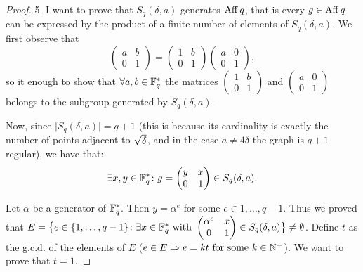 \begin{theorem}
\begin{proof}
5. I want to prove that $S_q(\delta,a)$ generates $\operatorname{Aff} q$, that is every $g \in \operatorname{Aff} q$ can be expressed by the product
of a finite number of elements of $S_q(\delta,a)$. We first observe that
\begin{equation}\label{gatto}
	\begin{pmatrix} a & b \\ 0 & 1 \end{pmatrix}=\begin{pmatrix} 1 & b \\ 0 & 1 \end{pmatrix} \begin{pmatrix} a & 0 \\ 0 & 1 \end{pmatrix},
\end{equation}
so it enough to show that $\forall a,b \in {\mathbb F}_q^{*}$ the matrices 
$\begin{pmatrix} 1 & b \\ 0 & 1 \end{pmatrix}$ and $\begin{pmatrix} a & 0 \\ 0 & 1 \end{pmatrix}$
belongs to the subgroup generated by $S_q(\delta,a)$.

Now, since $\vert S_q(\delta,a)\vert=q+1$ (this is because its cardinality is exactly the number of points adjacent to $\sqrt{\delta}$,
 and in the case $a\neq 4\delta$ the graph is $q+1$ regular), we have that:
 \begin{equation}\label{elem}
 	\exists x,y \in {\mathbb F}_q^{*} \colon g = \begin{pmatrix} y & x \\ 0 & 1 \end{pmatrix} \in S_q(\delta,a).
 \end{equation}

Let $\alpha$ be a generator of ${\mathbb F}_q^{*}$. Then $y=\alpha^e$ for some $e\in {1, \dots , q-1}.$ Thus we proved that
$E=\big\{ e \in \{1, \dots , q-1\} \colon \exists x \in {\mathbb F}_q^{*} \text{ with } \begin{pmatrix} \alpha^e & x \\ 0 & 1 \end{pmatrix} \in S_q(\delta,a) \big\} \neq \emptyset$.
Define $t$ as the g.c.d. of the elements of $E$
($e\in E \Rightarrow e=kt \text{ for some } k \in {\mathbb N}^{+}$). We want to prove that $t=1$.


\end{proof}
\end{theorem}
